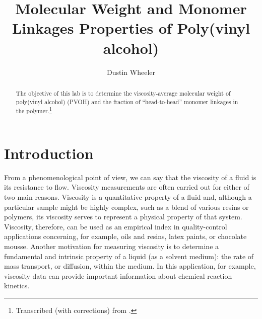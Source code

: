 \documentclass[nobib,nofonts,nols,nohyper]{tufte-handout}
\title{Molecular Weight and Monomer Linkages Properties of Poly(vinyl alcohol)}
\author{Dustin Wheeler}
\begin{document}
\maketitle%

\begin{abstract}
\noindent
The objective of this lab is to determine the viscosity-average molecular weight of poly(vinyl alcohol) (PVOH) and the fraction of ``head-to-head'' monomer linkages in the polymer.\thanks{Transcribed (with corrections) from \textcite{halpern97}.} %
\end{abstract}

\section{Introduction} %
\label{sec:intro}

From a phenomenological point of view, we can say that the viscosity of a fluid is its resistance to flow. 
Viscosity measurements are often carried out for either of two main reasons. 
Viscosity is a quantitative property of a fluid and, although a particular sample might be highly complex, such as a blend of various resins or polymers, its viscosity serves to represent a physical property of that system. 
Viscosity, therefore, can be used as an empirical index in quality-control applications concerning, for example, oils and resins, latex paints, or chocolate mousse. 
Another motivation for measuring viscosity is to determine a fundamental and intrinsic property of a liquid (as a solvent medium): the rate of mass transport, or diffusion, within the medium. 
In this application, for example, viscosity data can provide important information about chemical reaction kinetics. 
\end{document}
